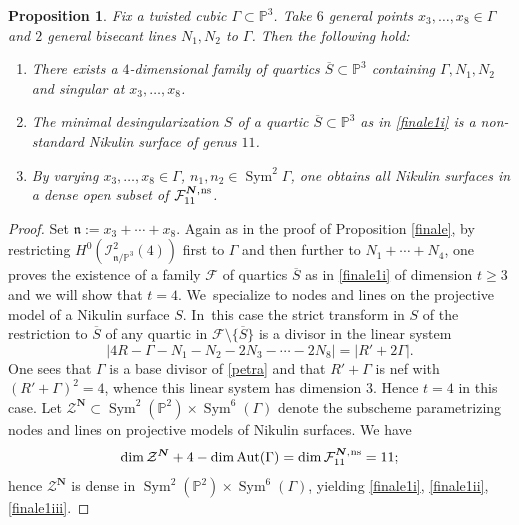 \documentclass[JEP,XML,SOM,Unicode,NoEqCountersInSection,published]{cedram}
\newcommand{\ns}{{\mkern1mu\mathrm{ns}}}
\newcommand{\bN}{\boldsymbol{N}}
\theoremstyle{plain}
\newtheorem{prop}[thm]{Proposition}
\theoremstyle{definition}
\DeclareMathOperator{\Aut}{Aut}
\DeclareMathOperator{\Sym}{Sym}
\newcommand\PP{{\mathbb P}}
\newcommand\F{{\mathcal F}}
\newcommand\Z{{\mathcal Z}}
\begin{document}
\begin{prop}\label{finale1}
Fix a twisted cubic $\Gamma\subset \PP^3$. Take $6$ general points $x_3,\ldots,x_8\in \Gamma$ and $2$ general bisecant lines $N_1,N_2$ to $\Gamma$. Then the following hold:
\begin{enumerate}
\item\label{finale1i}
There exists a $4$-dimensional family of quartics $\overline{S}\subset\mathbb P^3$ containing $\Gamma,N_1,N_2$ and singular at $x_3,\ldots,x_8$.
\item\label{finale1ii}
The minimal desingularization $S$ of a quartic $\overline{S}\subset\mathbb P^3$ as in \eqref{finale1i} is a non-standard Nikulin surface of genus $11$.
\item\label{finale1iii}
By varying $x_3,\ldots,x_8\in \Gamma$, $n_1, n_2\in \Sym^2\Gamma$, one obtains all Nikulin surfaces in a dense open subset of $\F_{11}^{\bN,\ns}$.
\end{enumerate}
\end{prop}

\begin{proof}
Set $\mathfrak n:=x_3+\cdots+x_8$. Again as in the proof of Proposition \ref{finale}, by restricting $H^0(\mathcal I^2_{\mathfrak{n}/\PP^3}(4))$ first to $\Gamma$ and then further to $N_1+\cdots+N_4$, one proves the existence of a family $\F$ of quartics $\overline{S}$ as in \eqref{finale1i} of dimension $t\geq 3$ and we will show that $t=4$. We~specialize to nodes and lines on the projective model of a Nikulin surface $S$. In~this case the strict transform in $S$ of the restriction to $\overline S$ of any quartic in $\F\setminus\{\overline S\}$ is a divisor in the linear system\vspace*{-3pt}
\begin{equation}\label{petra}|4R-\Gamma-N_1-N_2-2N_3-\cdots-2N_8|=|R'+2\Gamma|.\end{equation} One sees that $\Gamma$ is a base divisor of \eqref{petra} and that $R'+\Gamma$ is nef with \hbox{$(R'+\Gamma)^2=4$}, whence this linear system has dimension $3$. Hence $t= 4$ in this case. Let $\Z^{\bN}\subset \Sym^2(\PP^2)\times \Sym^6(\Gamma)$ denote the subscheme parametrizing nodes and lines on projective models of Nikulin surfaces. We have\vspace*{-3pt}
\[
\dim \Z^{\bN}+4-\dim\Aut(\Gamma)=\dim\F_{11}^{\bN,\ns}=11;
\]
hence $\Z^{\bN}$ is dense in $\Sym^2(\PP^2)\times \Sym^6(\Gamma)$, yielding \eqref{finale1i}, \eqref{finale1ii}, \eqref{finale1iii}.
\end{proof}
\end{document}
